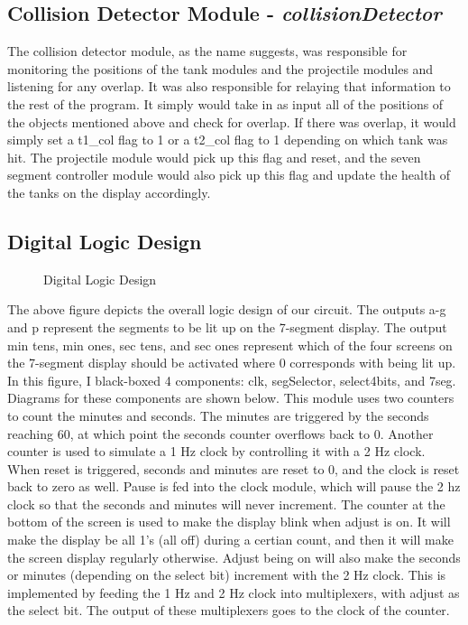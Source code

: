 \documentclass{article}
\begin{document}
\subsection*{Collision Detector Module - \textit{collisionDetector} }

The collision detector module, as the name suggests, was responsible for monitoring the positions of the tank modules and the projectile modules and listening for any overlap.  It was also responsible for relaying that information to the rest of the program. It simply would take in as input all of the positions of the objects mentioned above and check for overlap.  If there was overlap, it would simply set a t1\_col flag to 1 or a t2\_col flag to 1 depending on which tank was hit.  The projectile module would pick up this flag and reset, and the seven segment controller module would also pick up this flag and update the health of the tanks on the display accordingly.

\subsection*{Digital Logic Design}
\begin{figure}[H]
	\begin{center}
		\caption{Digital Logic Design}
	\end{center}
\end{figure}

The above figure depicts the overall logic design of our circuit. The outputs a-g and p represent the segments to be lit up on the 7-segment display. The output min tens, min ones, sec tens, and sec ones represent which of the four screens on the 7-segment display should be activated where 0 corresponds with being lit up. In this figure, I black-boxed 4 components: clk, segSelector, select4bits, and 7seg. Diagrams for these components are shown below. This module uses two counters to count the minutes and seconds. The minutes are triggered by the seconds reaching 60, at which point the seconds counter overflows back to 0. Another counter is used to simulate a 1 Hz clock by controlling it with a 2 Hz clock. When reset is triggered, seconds and minutes are reset to 0, and the clock is reset back to zero as well. Pause is fed into the clock module, which will pause the 2 hz clock so that the seconds and minutes will never increment. The counter at the bottom of the screen is used to make the display blink when adjust is on. It will make the display be all 1's (all off) during a certian count, and then it will make the screen display regularly otherwise. Adjust being on will also make the seconds or minutes (depending on the select bit) increment with the 2 Hz clock. This is implemented by feeding the 1 Hz and 2 Hz clock into multiplexers, with adjust as the select bit. The output of these multiplexers goes to the clock of the counter.
\end{document}
